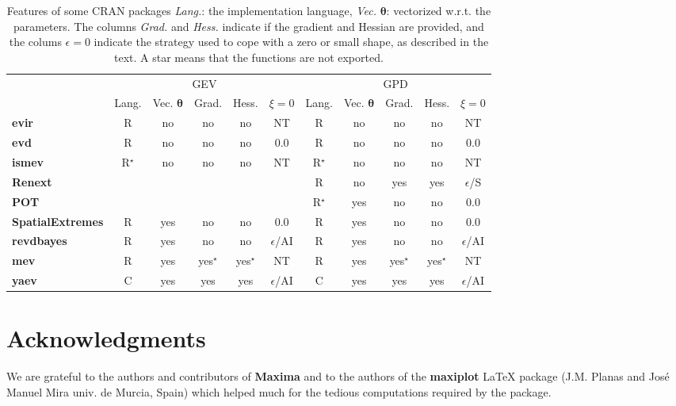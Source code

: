 \documentclass[11pt]{article}\usepackage[]{graphicx}\usepackage[]{xcolor}
\newcommand{\bs}{\boldsymbol}
\begin{document}
\begin{table}
    \centering \small
    \begin{tabular}{| l || c | c | c | c | c || c | c | c | c | c |}
      \hline
      \multicolumn{1}{|c||}{\raisebox{-0.3em}{Package}}
      & \multicolumn{5}{c||}{GEV}
      & \multicolumn{5}{c|}{GPD}\\ \cline{2-6} \cline{7-11}
      \multicolumn{1}{|c||}{}
      & \multicolumn{1}{c|}{Lang.}
      & \multicolumn{1}{c|}{Vec. $\bs{\theta}$}
      & \multicolumn{1}{c|}{Grad.}
      & \multicolumn{1}{c|}{Hess.}
      & \multicolumn{1}{c||}{$\xi=0$}
      & \multicolumn{1}{c|}{Lang.}
      & \multicolumn{1}{c|}{Vec. $\bs{\theta}$}
      & \multicolumn{1}{c|}{Grad.}
      & \multicolumn{1}{c|}{Hess.}
      & \multicolumn{1}{c|}{$\xi=0$} \\ \hline\hline
      \textbf{evir}
      & R & no & no & no & NT & R & no & no & no & NT\\ \hline
      \textbf{evd}
      & R & no & no & no & 0.0 & R & no & no & no & 0.0\\ \hline
      \textbf{ismev}
      & R$^\star$ & no & no & no & NT & R$^\star$ & no & no & no & NT\\ \hline
      \textbf{Renext}
      &  &  &  &  &  & R & no & yes & yes & $\epsilon$/S \\ \hline
      \textbf{POT}
      &  &  &  &  &  & R$^\star$ & yes & no & no & 0.0 \\ \hline
      \textbf{SpatialExtremes}
      & R  & yes & no & no & $0.0$ & R & yes & no & no & $0.0$ \\ \hline   
      \textbf{revdbayes}
      & R  & yes & no & no & $\epsilon$/AI & R & yes & no & no & $\epsilon$/AI \\ \hline
      \textbf{mev}
      & R  & yes & yes$^\star$ & yes$^\star$& NT & R & yes & yes$^\star$
      & yes$^\star$ & NT \\ \hline
      {\color{red}\textbf{yaev}}
      & C & yes & yes & yes & $\epsilon$/AI   
      & C & yes & yes & yes & $\epsilon$/AI \\ \hline
    \end{tabular}
    \caption{\small \sf Features of some CRAN packages \label{TabXi}
      \textit{Lang.}: the implementation language, \textit{Vec.}
      $\bs{\theta}$: vectorized w.r.t. the parameters. The columns
      \textit{Grad.} and \textit{Hess.}  indicate if the gradient and
      Hessian are provided, and the colums $\epsilon = 0$ indicate the
      strategy used to cope with a zero or small shape, as described
      in the text. A star means that the functions are not exported.}
  \end{table}


\section*{Acknowledgments}

We are grateful to the authors and contributors of \textbf{Maxima} and
to the authors of the \textbf{maxiplot} \LaTeX{} package (J.M. Planas
and José Manuel Mira univ. de Murcia, Spain) which helped much for the
tedious computations required by the package.
\end{document}
